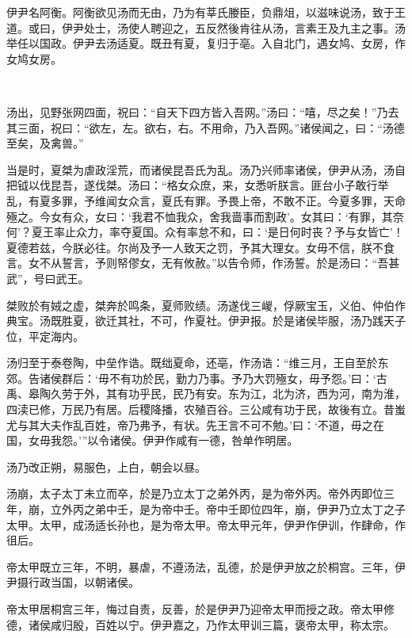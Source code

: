 \documentclass[UTF8,12pt,AutoFakeBold]{ctexart}
\begin{document}
	伊尹名阿衡。阿衡欲见汤而无由，乃为有莘氏媵臣，负鼎俎，以滋味说汤，致于王道。或曰，伊尹处士，汤使人聘迎之，五反然後肯往从汤，言素王及九主之事。汤举任以国政。伊尹去汤适夏。既丑有夏，复归于亳。入自北门，遇女鸠、女房，作女鸠女房。
	\begin{figure}[htb]
		\centering
		\\
		\captionsetup{font=footnotesize}
		\label{图：幂律参数空间}
	\end{figure}
	汤出，见野张网四面，祝曰：“自天下四方皆入吾网。”汤曰：“嘻，尽之矣！”乃去其三面，祝曰：“欲左，左。欲右，右。不用命，乃入吾网。”诸侯闻之，曰：“汤德至矣，及禽兽。”
	
	当是时，夏桀为虐政淫荒，而诸侯昆吾氏为乱。汤乃兴师率诸侯，伊尹从汤，汤自把钺以伐昆吾，遂伐桀。汤曰：“格女众庶，来，女悉听朕言。匪台小子敢行举乱，有夏多罪，予维闻女众言，夏氏有罪。予畏上帝，不敢不正。今夏多罪，天命殛之。今女有众，女曰：‘我君不恤我众，舍我啬事而割政’。女其曰：‘有罪，其奈何’？夏王率止众力，率夺夏国。众有率怠不和，曰：‘是日何时丧？予与女皆亡’！夏德若兹，今朕必往。尔尚及予一人致天之罚，予其大理女。女毋不信，朕不食言。女不从誓言，予则帑僇女，无有攸赦。”以告令师，作汤誓。於是汤曰：“吾甚武”，号曰武王。
	
	桀败於有娀之虚，桀奔於鸣条，夏师败绩。汤遂伐三嵕，俘厥宝玉，义伯、仲伯作典宝。汤既胜夏，欲迁其社，不可，作夏社。伊尹报。於是诸侯毕服，汤乃践天子位，平定海内。
	
	汤归至于泰卷陶，中垒作诰。既绌夏命，还亳，作汤诰：“维三月，王自至於东郊。告诸侯群后：‘毋不有功於民，勤力乃事。予乃大罚殛女，毋予怨。’曰：‘古禹、皋陶久劳于外，其有功乎民，民乃有安。东为江，北为济，西为河，南为淮，四渎已修，万民乃有居。后稷降播，农殖百谷。三公咸有功于民，故後有立。昔蚩尤与其大夫作乱百姓，帝乃弗予，有状。先王言不可不勉。’曰：‘不道，毋之在国，女毋我怨。’”以令诸侯。伊尹作咸有一德，咎单作明居。
	
	汤乃改正朔，易服色，上白，朝会以昼。
	
	汤崩，太子太丁未立而卒，於是乃立太丁之弟外丙，是为帝外丙。帝外丙即位三年，崩，立外丙之弟中壬，是为帝中壬。帝中壬即位四年，崩，伊尹乃立太丁之子太甲。太甲，成汤适长孙也，是为帝太甲。帝太甲元年，伊尹作伊训，作肆命，作徂后。
	
	帝太甲既立三年，不明，暴虐，不遵汤法，乱德，於是伊尹放之於桐宫。三年，伊尹摄行政当国，以朝诸侯。
	
	帝太甲居桐宫三年，悔过自责，反善，於是伊尹乃迎帝太甲而授之政。帝太甲修德，诸侯咸归殷，百姓以宁。伊尹嘉之，乃作太甲训三篇，褒帝太甲，称太宗。
	
\end{document}
